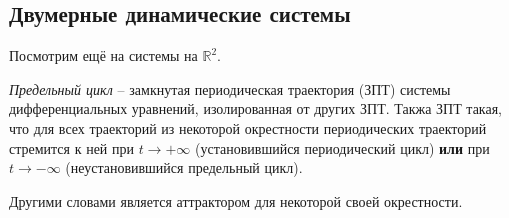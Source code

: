 


\subsection{Двумерные динамические системы}


Посмотрим ещё на системы на $\mathbb{R}^2$. 

\begin{to_def}
    \textit{Предельный цикл}  -- замкнутая периодическая траектория (ЗПТ) системы дифференциальных уравнений, изолированная от других ЗПТ. Такжа ЗПТ такая, что для всех траекторий из некоторой окрестности периодических траекторий стремится к ней при $t \to + \infty$ (установившийся периодический цикл) \textbf{или} при $t \to - \infty$ (неустановившийся предельный цикл).
\end{to_def}

Другими словами является аттрактором для некоторой своей окрестности. 





